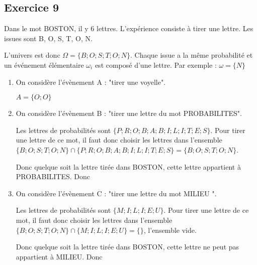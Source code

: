 \documentclass[openany]{book}
\begin{document}
 \begin{minipage}{0.5\linewidth}
 

\subsection{Exercice 9}

Dans le mot BOSTON, il y 6 lettres. L'expérience consiste à tirer une lettre.
Les issues sont B, O, S, T, O, N.

L'univers est donc $\Omega = \lbrace  B; O; S; T; O; N \rbrace$. Chaque issue a la même probabilité et un événement élémentaire $\omega_i$ est composé d'une lettre. Par exemple : $\omega = \lbrace  N \rbrace$
\begin{enumerate}
\item On considère l'évènement A : "tirer une voyelle".

$A = \lbrace  O;  O  \rbrace$


\item On considère l'évènement B : "tirer une lettre du mot PROBABILITES".

Les lettres de probabilités sont $\lbrace  P;R;O;B;A;B;I;L;I;T;E;S \rbrace$. Pour tirer une lettre de ce mot, il faut donc choisir les lettres dans l'ensemble $\lbrace  B; O; S; T; O; N \rbrace \cap \lbrace  P;R;O;B;A;B;I;L;I;T;E;S \rbrace = \lbrace  B; O; S; T; O; N \rbrace$.

Donc quelque soit la lettre tirée dans BOSTON, cette lettre appartient à PROBABILITES. Donc 

\item On considère l'évènement C : "tirer une lettre du mot MILIEU ".

Les lettres de probabilités sont $\lbrace  M;I;L;I;E;U \rbrace$. Pour tirer une lettre de ce mot, il faut donc choisir les lettres dans l'ensemble $\lbrace  B; O; S; T; O; N \rbrace \cap \lbrace M;I;L;I;E;U \rbrace = \lbrace  \rbrace$, l'ensemble vide.

Donc quelque soit la lettre tirée dans BOSTON, cette lettre ne peut pas appartient à MILIEU. Donc 


\end{enumerate}


\end{minipage}

\newpage
\end{document}
